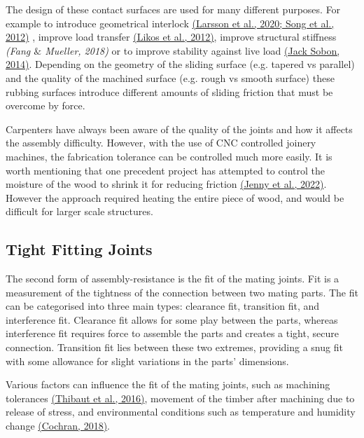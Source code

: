 \documentclass[11pt]{book}
\begin{document}
\vspace{1\baselineskip}
The design of these contact surfaces are used for many different purposes. For example to introduce geometrical interlock \href{https://www.zotero.org/google-docs/?FoyCyy}{(Larsson et al., 2020; Song et al., 2012)}\textit{ }, improve load transfer \href{https://www.zotero.org/google-docs/?uGwPtv}{(Likos et al., 2012)}, improve structural stiffness\textit{ \href{https://www.zotero.org/google-docs/?vLOXsl}{}(Fang $\&$ Mueller, 2018)} or to improve stability against live load \href{https://www.zotero.org/google-docs/?PPcjqg}{(Jack Sobon, 2014)}. Depending on the geometry of the sliding surface (e.g. tapered vs parallel) and the quality of the machined surface (e.g. rough vs smooth surface) these rubbing surfaces introduce different amounts of sliding friction that must be overcome by force.

Carpenters have always been aware of the quality of the joints and how it affects the assembly difficulty. However, with the use of CNC controlled joinery machines, the fabrication tolerance can be controlled much more easily. It is worth mentioning that one precedent project has attempted to control the moisture of the wood to shrink it for reducing friction \href{https://www.zotero.org/google-docs/?Wr3WNi}{(Jenny et al., 2022)}. However the approach required heating the entire piece of wood, and would be difficult for larger scale structures.

\subsection{Tight Fitting Joints}

The second form of assembly-resistance is the fit of the mating joints. Fit is a measurement of the tightness of the connection between two mating parts. The fit can be categorised into three main types: clearance fit, transition fit, and interference fit. Clearance fit allows for some play between the parts, whereas interference fit requires force to assemble the parts and creates a tight, secure connection. Transition fit lies between these two extremes, providing a snug fit with some allowance for slight variations in the parts' dimensions.

Various factors can influence the fit of the mating joints, such as machining tolerances \href{https://www.zotero.org/google-docs/?FYX9pE}{(Thibaut et al., 2016)}, movement of the timber after machining due to release of stress, and environmental conditions such as temperature and humidity change \href{https://www.zotero.org/google-docs/?2HzXKN}{(Cochran, 2018)}. 
\end{document}
